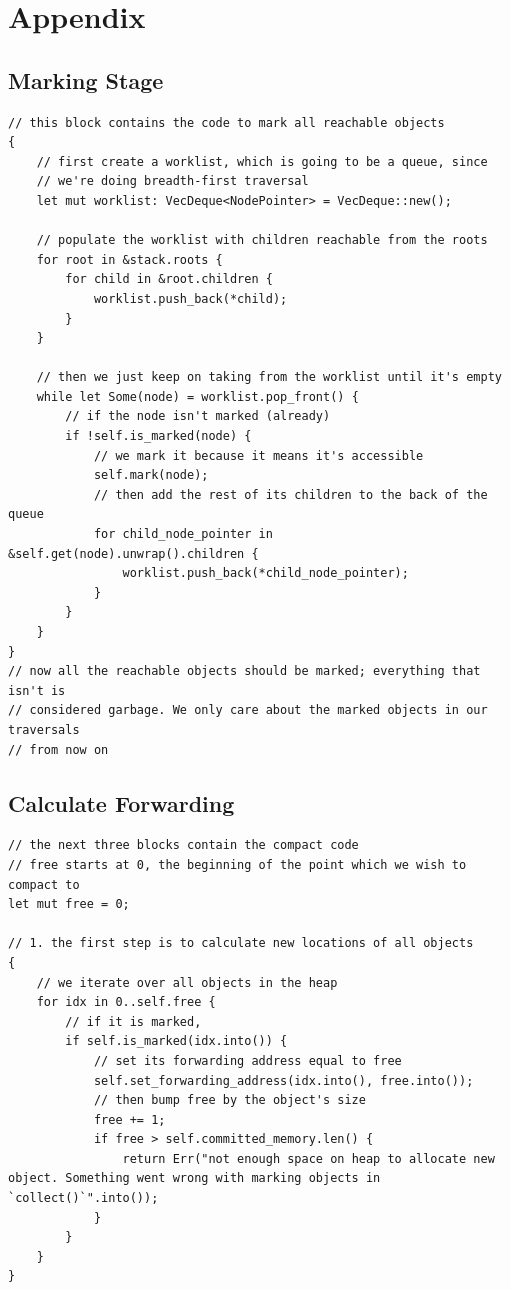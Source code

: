 \documentclass[index]{subfiles}
\begin{document}
\newpage

\raggedright{}
\printbibliography[heading=bibintoc]

\section{Appendix}
\appendix
\renewcommand{\thesubsection}{\Alph{subsection}}

\subsection{Marking Stage}
\begin{verbatim}
// this block contains the code to mark all reachable objects
{
    // first create a worklist, which is going to be a queue, since
    // we're doing breadth-first traversal
    let mut worklist: VecDeque<NodePointer> = VecDeque::new();

    // populate the worklist with children reachable from the roots
    for root in &stack.roots {
        for child in &root.children {
            worklist.push_back(*child);
        }
    }

    // then we just keep on taking from the worklist until it's empty
    while let Some(node) = worklist.pop_front() {
        // if the node isn't marked (already)
        if !self.is_marked(node) {
            // we mark it because it means it's accessible
            self.mark(node);
            // then add the rest of its children to the back of the queue
            for child_node_pointer in &self.get(node).unwrap().children {
                worklist.push_back(*child_node_pointer);
            }
        }
    }
}
// now all the reachable objects should be marked; everything that isn't is
// considered garbage. We only care about the marked objects in our traversals
// from now on
\end{verbatim}
\subsection{Calculate Forwarding}
\begin{verbatim}
// the next three blocks contain the compact code
// free starts at 0, the beginning of the point which we wish to compact to
let mut free = 0;

// 1. the first step is to calculate new locations of all objects
{
    // we iterate over all objects in the heap
    for idx in 0..self.free {
        // if it is marked,
        if self.is_marked(idx.into()) {
            // set its forwarding address equal to free
            self.set_forwarding_address(idx.into(), free.into());
            // then bump free by the object's size
            free += 1;
            if free > self.committed_memory.len() {
                return Err("not enough space on heap to allocate new object. Something went wrong with marking objects in `collect()`".into());
            }
        }
    }
}
\end{verbatim}
\end{document}
